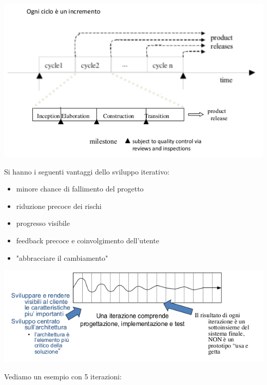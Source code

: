 \documentclass[a4paper,12pt, oneside]{book}
\begin{document}
\begin{center}
\includegraphics[scale=0.7]{img/ms5.png}
\end{center}
Si hanno i seguenti vantaggi dello sviluppo iterativo:
\begin{itemize}
\item minore chance di fallimento del progetto
\item riduzione precoce dei rischi
\item progresso visibile
\item feedback precoce e coinvolgimento dell'utente
\item "abbracciare il cambiamento"
\end{itemize}
\begin{center}
\includegraphics[scale=0.7]{img/ms6.png}
\end{center}
Vediamo un esempio con 5 iterazioni:
\end{document}
